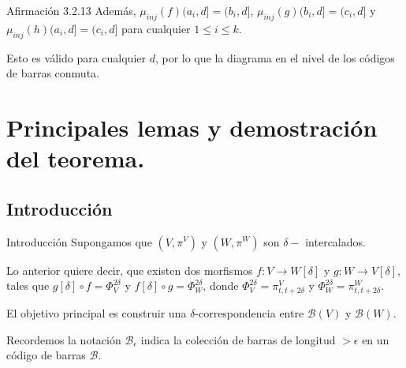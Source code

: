 \documentclass{beamer}
\begin{document}
\begin{frame}{Afirmación 3.2.13}
    Además, $\mu_{inj}(f)(a_{i},d]=(b_{i},d]$, $\mu_{inj}(g)(b_{i},d]=(c_{i},d]$ y $\mu_{inj}(h)(a_{i},d]=(c_{i},d]$ para cualquier $1\leq  i \leq k$.
    \newline
    \pause

    Esto es válido para cualquier $d$, por lo que la diagrama en el nivel de los códigos de barras conmuta.
\end{frame}

\section{Principales lemas y demostración del teorema.}
\subsection{Introducción}
\begin{frame}{Introducción}
    Supongamos que $(V,\pi^{V})$ y $(W,\pi^{W})$ son $\delta-$ intercalados.
    \newline
    \pause
    
    Lo anterior quiere decir, que existen dos morfismos $f:V \to W [\delta]$ y $g : W \to V [\delta]$, tales que $g[\delta] \circ f = \Phi^{ 2\delta}_{V}$ y $f[\delta] \circ g = \Phi^{2\delta}_{W}$, donde $\Phi^{2\delta}_{V} = \pi^{V}_{t,t+2\delta}$ y $\Phi_{W}^{2\delta}=\pi^{W}_{t,t+2\delta}$. 
    \newline 
    \pause
    
    El objetivo principal es construir una $\delta$-correspondencia entre $\mathcal{B}(V)$ y $\mathcal{B}(W)$.
    \newline
    \pause

    Recordemos la notación $\mathcal{B}_{\epsilon}$ indica la colección de barras de longitud $> \epsilon$ en un código de barras $\mathcal{B}$.
    
\end{frame}
\end{document}
